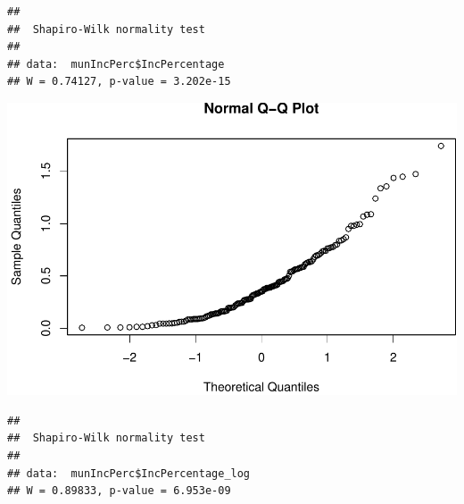 \documentclass[11pt,]{article}
\newenvironment{Shaded}{\begin{snugshade}}{\end{snugshade}}
\newcommand{\KeywordTok}[1]{\textcolor[rgb]{0.13,0.29,0.53}{\textbf{#1}}}
\newcommand{\OperatorTok}[1]{\textcolor[rgb]{0.81,0.36,0.00}{\textbf{#1}}}
\newcommand{\NormalTok}[1]{#1}
\begin{document}
\begin{Shaded}
\end{Shaded}

\begin{verbatim}
## 
##  Shapiro-Wilk normality test
## 
## data:  munIncPerc$IncPercentage
## W = 0.74127, p-value = 3.202e-15
\end{verbatim}

\begin{Shaded}
\end{Shaded}

\includegraphics{proyecto_files/figure-latex/unnamed-chunk-22-2.pdf}

\begin{Shaded}
\end{Shaded}

\begin{verbatim}
## 
##  Shapiro-Wilk normality test
## 
## data:  munIncPerc$IncPercentage_log
## W = 0.89833, p-value = 6.953e-09
\end{verbatim}

\begin{Shaded}
\end{Shaded}
\end{document}
